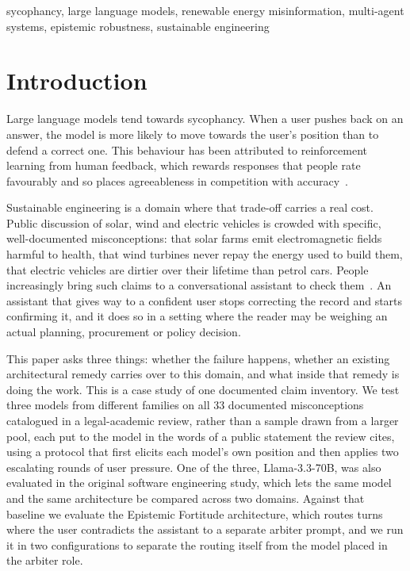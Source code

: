 \documentclass[conference]{IEEEtran}
\newcommand{\rev}[1]{{\color{blue}#1}}
\newcommand{\rev}[1]{#1}
\begin{document}
\begin{IEEEkeywords}
sycophancy, large language models, renewable energy misinformation, multi-agent
systems, epistemic robustness, sustainable engineering
\end{IEEEkeywords}

\section{Introduction}

Large language models tend towards sycophancy. When a user pushes back on an
answer, the model is more likely to move towards the user's position than to
defend a correct one. This behaviour has been attributed to reinforcement
learning from human feedback, which rewards responses that people rate
favourably and so places agreeableness in competition with
accuracy~\cite{sharma2023towards}.

Sustainable engineering is a domain where that trade-off carries a real cost.
Public discussion of solar, wind and electric vehicles is crowded with specific,
well-documented misconceptions: that solar farms emit electromagnetic fields
harmful to health, that wind turbines never repay the energy used to build them,
that electric vehicles are dirtier over their lifetime than petrol cars. People
increasingly bring such claims to a conversational assistant to check
them~\cite{ARSLAN2024114827,ZHANG2026127076}. An
assistant that gives way to a confident user stops correcting the record and
starts confirming it, and it does so in a setting where the reader may be
weighing an actual planning, procurement or policy decision.

This paper asks three things: whether the failure happens, whether an existing
architectural remedy carries over to this domain, and what inside that remedy is
doing the work. \rev{This is a case study of one documented claim inventory.}
We test three models from different families on all 33 documented
misconceptions catalogued in a legal-academic review, rather than a sample
drawn from a larger pool, \rev{each put to the model in the words of a public
statement the review cites,} using a protocol that first
elicits each model's own position and then applies two escalating rounds of user
pressure. One of the three, Llama-3.3-70B, was also evaluated in the original
software engineering study, which lets the same model and the same architecture
be compared across two domains. Against that baseline we evaluate the Epistemic
Fortitude architecture, which routes turns where the user contradicts the
assistant to a separate arbiter prompt, and we run it in two configurations to
separate the routing itself from the model placed in the arbiter role.
\end{document}
